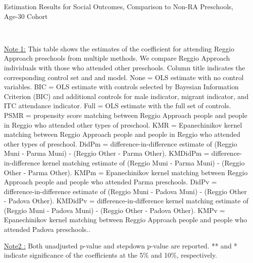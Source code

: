 \begin{table}[H] \caption{Estimation Results for Social Outcomes, Comparison to Non-RA Preschools, Age-30 Cohort} \label{ols-S-adult30-reg-other}
\scalebox{0.6}{}
\vspace{1ex} \\
\footnotesize\raggedright{\underline{Note 1:} This table shows the estimates of the coefficient for attending Reggio Approach preschools from multiple methods. We compare Reggio Approach individuals with those who attended other preschools. Column title indicates the corresponding control set and and model. None = OLS estimate with no control variables. BIC = OLS estimate with controls selected by Bayesian Information Criterion (BIC) and additional controls for male indicator, migrant indicator, and ITC attendance indicator. Full = OLS estimate with the full set of controls. PSMR =  propensity score matching between Reggio Approach people and people in Reggio who attended other types of preschool. KMR = Epanechinikov kernel matching between Reggio Approach people and people in Reggio who attended other types of preschool. DidPm = difference-in-difference estimate of (Reggio Muni - Parma Muni) - (Reggio Other - Parma Other). KMDidPm = difference-in-difference kernel matching estimate of (Reggio Muni - Parma Muni) - (Reggio Other - Parma Other).   KMPm = Epanechinikov kernel matching between Reggio Approach people and people who attended Parma preschools. DidPv = difference-in-difference estimate of (Reggio Muni - Padova Muni) - (Reggio Other - Padova Other). KMDidPv = difference-in-difference kernel matching estimate of (Reggio Muni - Padova Muni) - (Reggio Other - Padova Other).  KMPv = Epanechinikov kernel matching between Reggio Approach people and people who attended Padova preschools..}

\footnotesize\raggedright{\underline{Note2 :} Both unadjusted p-value and stepdown p-value are reported. ** and * indicate significance of the coefficients at the 5\% and 10\%, respectively.}
\end{table}

